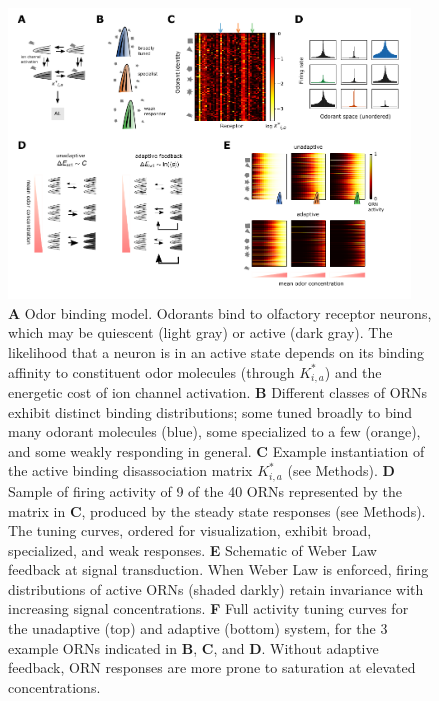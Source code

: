 \begin{figure}
\includegraphics[width=0.95\textwidth]{figures/Figures_tuning_curve}
\caption{\footnotesize{\textbf{A} Odor binding model. Odorants bind to olfactory receptor neurons, which may be quiescent (light gray) or active (dark gray). The likelihood that a neuron is in an active state depends on its binding affinity to constituent odor molecules (through $K^*_{i, a}$) and the energetic cost of ion channel activation. \textbf{B} Different classes of ORNs exhibit distinct binding distributions; some tuned broadly to bind many odorant molecules (blue), some specialized to a few (orange), and some weakly responding in general. \textbf{C} Example instantiation of the active binding disassociation matrix $K^*_{i, a}$ (see Methods). \textbf{D} Sample of firing activity of 9 of the 40 ORNs represented by the matrix in \textbf{C}, produced by the steady state responses (see Methods). The tuning curves, ordered for visualization, exhibit broad, specialized, and weak responses. \textbf{E} Schematic of Weber Law feedback at signal transduction. When Weber Law is enforced, firing distributions of active ORNs (shaded darkly) retain invariance with increasing signal concentrations. \textbf{F} Full activity tuning curves for the unadaptive (top) and adaptive (bottom) system, for the 3 example ORNs indicated in \textbf{B}, \textbf{C}, and \textbf{D}. Without adaptive feedback, ORN responses are more prone to saturation at elevated concentrations.}}
\label{fig:tuning_curves}
\end{figure}

